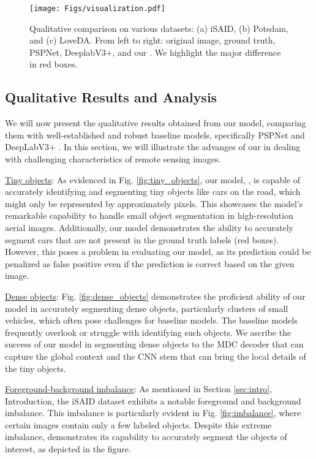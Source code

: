 \documentclass[journal]{IEEEtran}
\begin{document}
\begin{figure*}
    \centering
    \texttt{[image: Figs/visualization.pdf]}
    \break

    \caption{Qualitative comparison on various datasets: (a) iSAID, (b) Potsdam, and (c) LoveDA. From left to right: original image, ground truth, PSPNet, DeeplabV3+, and our \model. We highlight the major difference in red boxes.}
    \label{fig:qual_all}
\end{figure*}


\subsection{Qualitative Results and Analysis}
We will now present the qualitative results obtained from our model, comparing them
with well-established and robust baseline models, specifically PSPNet \cite{zhao2017pyramid} and DeepLabV3+ \cite{chen2018encoder}. In this section, we will illustrate the advanges of our \model in dealing with challenging characteristics of remote sensing images.

\noindent
\underline{Tiny objects}: 
As evidenced in Fig. \ref{fig:tiny_objects}, our model, \model, is capable of accurately identifying and segmenting tiny objects like cars on the road, which might only be represented by approximately  pixels. This showcases the model's remarkable capability to handle small object segmentation in high-resolution aerial images. Additionally, our model demonstrates the ability to accurately segment cars that are not present in the ground truth labels (red boxes). 
However, this poses a problem in evaluating our model, as its prediction could be penalized as false positive even if the prediction is correct based on the given image. 

\noindent
\underline{Dense objects}: 
Fig. \ref{fig:dense_objects} demonstrates the proficient ability of our model in accurately segmenting dense objects, particularly clusters of small vehicles, which often pose challenges for baseline models. The baseline models frequently overlook or struggle with identifying such objects. We ascribe the success of our model in segmenting dense objects to the MDC decoder that can capture the global context and the CNN stem that can bring the local details of the tiny objects. 


\noindent
\underline{Foreground-background imbalance}: 
As mentioned in Section \ref{sec:intro}, Introduction, the iSAID dataset exhibits a notable foreground and background imbalance. This imbalance is particularly evident in Fig. \ref{fig:imbalance}, where certain images contain only a few labeled objects. Despite this extreme imbalance, \model demonstrates its capability to accurately segment the objects of interest, as depicted in the figure. 
\end{document}
